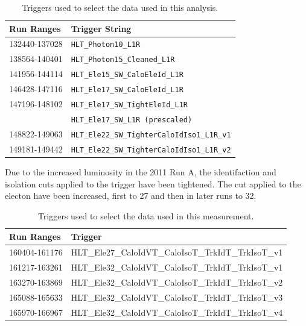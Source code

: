 \begin{table}[htbp]
  \centering
  \begin{tabular}{ l l }
    \toprule
    Run Ranges & Trigger String\\
    \midrule
    132440-137028 & \verb=HLT_Photon10_L1R= \\
    138564-140401 & \verb=HLT_Photon15_Cleaned_L1R= \\
    141956-144114 & \verb=HLT_Ele15_SW_CaloEleId_L1R= \\
    146428-147116 & \verb=HLT_Ele17_SW_CaloEleId_L1R= \\
    147196-148102 & \verb=HLT_Ele17_SW_TightEleId_L1R= \\
                  & \verb=HLT_Ele17_SW_L1R (prescaled)= \\ 
    148822-149063 & \verb=HLT_Ele22_SW_TighterCaloIdIso1_L1R_v1= \\
    149181-149442 & \verb=HLT_Ele22_SW_TighterCaloIdIso1_L1R_v2= \\
    \bottomrule
  \end{tabular}
  \caption{Triggers used to select the data used in this analysis.}
  \label{asym36:triggers}
\end{table}

Due to the increased luminosity in the 2011 Run A, the identifaction and
isolation cuts applied to the trigger have been tightened. The \PT cut applied
to the electon have been increased, first to \unit{27}{\GeV} and then in later
runs to \unit{32}{\GeV}.

\begin{table}[htbp]
  \begin{center}
    \leavevmode
     \begin{tabular}{ll} 
      Run Ranges & Trigger  \\
     \hline
     160404-161176 & HLT\_Ele27\_CaloIdVT\_CaloIsoT\_TrkIdT\_TrkIsoT\_v1  \\
     161217-163261 & HLT\_Ele32\_CaloIdVT\_CaloIsoT\_TrkIdT\_TrkIsoT\_v1  \\
     163270-163869 & HLT\_Ele32\_CaloIdVT\_CaloIsoT\_TrkIdT\_TrkIsoT\_v2  \\
     165088-165633 & HLT\_Ele32\_CaloIdVT\_CaloIsoT\_TrkIdT\_TrkIsoT\_v3  \\
     165970-166967 & HLT\_Ele32\_CaloIdVT\_CaloIsoT\_TrkIdT\_TrkIsoT\_v4  \\
     \end{tabular}

  \caption{Triggers used to select the data used in this measurement.}
  \label{asym840:triggers}

   \end{center}
\end{table}

